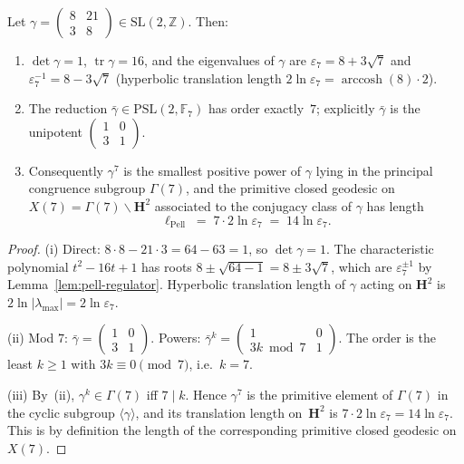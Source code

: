 \begin{lemma}
\label{lem:pell-geodesic}
Let $\gamma = \begin{pmatrix} 8 & 21 \\ 3 & 8 \end{pmatrix}
\in \mathrm{SL}(2,\mathbb{Z})$.  Then:
\begin{enumerate}
\item $\det\gamma = 1$, $\operatorname{tr}\gamma = 16$, and
  the eigenvalues of $\gamma$ are
  $\varepsilon_7 = 8 + 3\sqrt{7}$ and
  $\varepsilon_7^{-1} = 8 - 3\sqrt{7}$
  (hyperbolic translation length
  $2\ln\varepsilon_7 = \operatorname{arccosh}(8)\cdot 2$).
\item The reduction $\bar\gamma \in \mathrm{PSL}(2,\mathbb{F}_7)$
  has order exactly~$7$; explicitly $\bar\gamma$ is the unipotent
  $\begin{pmatrix}1 & 0 \\ 3 & 1\end{pmatrix}$.
\item Consequently $\gamma^7$ is the smallest positive power of
  $\gamma$ lying in the principal congruence subgroup
  $\Gamma(7)$, and the primitive closed geodesic on
  $X(7) = \Gamma(7)\backslash\mathbf{H}^2$ associated to the
  conjugacy class of $\gamma$ has length
  \begin{equation}\label{eq:pell-geodesic-length}
    \ell_{\mathrm{Pell}}
    \;=\; 7 \cdot 2\ln\varepsilon_7
    \;=\; 14\ln\varepsilon_7.
  \end{equation}
\end{enumerate}
\end{lemma}
\begin{proof}
(i) Direct: $8\cdot 8 - 21\cdot 3 = 64 - 63 = 1$, so $\det\gamma = 1$.
The characteristic polynomial $t^2 - 16t + 1$ has roots
$8 \pm \sqrt{64 - 1} = 8 \pm 3\sqrt{7}$, which are
$\varepsilon_7^{\pm 1}$ by Lemma~\ref{lem:pell-regulator}.
Hyperbolic translation length of $\gamma$ acting on
$\mathbf{H}^2$ is $2\ln|\lambda_{\max}| = 2\ln\varepsilon_7$.

(ii) Mod $7$: $\bar\gamma = \begin{pmatrix} 1 & 0 \\ 3 & 1 \end{pmatrix}$.
Powers: $\bar\gamma^k = \begin{pmatrix} 1 & 0 \\ 3k \bmod 7 & 1 \end{pmatrix}$.
The order is the least $k \ge 1$ with $3k \equiv 0 \pmod 7$,
i.e.\ $k = 7$.

(iii) By~(ii), $\gamma^k \in \Gamma(7)$ iff $7 \mid k$.
Hence $\gamma^7$ is the primitive element of $\Gamma(7)$ in the
cyclic subgroup $\langle\gamma\rangle$, and its translation
length on~$\mathbf{H}^2$ is $7\cdot 2\ln\varepsilon_7
= 14\ln\varepsilon_7$.  This is by definition the length of
the corresponding primitive closed geodesic on $X(7)$.
\end{proof}

